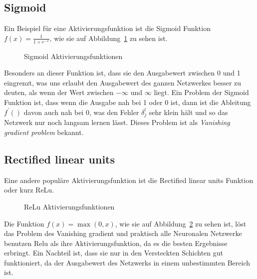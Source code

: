 \documentclass[12pt,a4paper]{report}
\begin{document}
\subsection{Sigmoid}
Ein Beispiel für eine Aktivierungsfunktion ist die Sigmoid Funktion $f(x) = \frac{1}{1 + e^{-x}}$,
wie sie auf Abbildung~\ref{fig:activation1} zu sehen ist.
\begin{figure}[h]
    \centering
{}
    \caption{Sigmoid Aktivierungsfunktionen}
    \label{fig:activation1}
\end{figure}
Besonders an dieser Funktion ist, dass sie den Ausgabewert zwischen 0 und 1 eingrenzt, was uns erlaubt den Ausgabewert des ganzen
Netzwerkes besser zu deuten, als wenn der Wert zwischen $-\infty$ und $\infty$ liegt.
Ein Problem der Sigmoid Funktion ist, dass wenn die Ausgabe nah bei 1 oder 0 ist, dann ist die Ableitung $f^\prime()$ davon auch nah bei 0,
was den Fehler $\delta^l_j$ sehr klein hält und so das Netzwerk nur noch langsam lernen lässt.
Dieses Problem ist als \textit{Vanishing gradient problem} bekannt.
\subsection{Rectified linear units}
Eine andere populäre Aktivierungsfunktion ist die Rectified linear units Funktion oder kurz ReLu.
\begin{figure}[h]
    \centering
{}
    \caption{ReLu Aktivierungsfunktionen}
    \label{fig:activation2}
\end{figure}
Die Funktion $f(x) = \max(0, x)$, wie sie auf Abbildung~\ref{fig:activation2} zu sehen ist,
löst das Problem des Vanishing gradient und praktisch alle Neuronalen Netzwerke benutzen Relu als ihre Aktivierungsfunktion,
da es die besten Ergebnisse erbringt.
Ein Nachteil ist, dass sie nur in den Versteckten Schichten gut funktioniert,
da der Ausgabewert des Netzwerks in einem unbestimmten Bereich ist.
\end{document}
